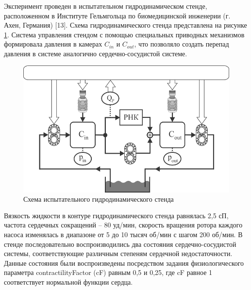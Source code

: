 Эксперимент проведен в испытательном гидродинамическом стенде, расположенном в Институте Гельмгольца по биомедицинской инженерии (г. Ахен, Германия) [13]. Схема гидродинамического стенда представлена на рисунке \ref{img:mcl}. Система управления стендом с помощью специальных приводных механизмов формировала давления в камерах $C_{in}$ и $C_{out}$, что позволяло создать перепад давления в системе аналогично сердечно-сосудистой системе.

\begin{figure}[!ht] 
  \center
  \includegraphics [scale=1.8] {../images/mcl_scheme_abs}
  \caption{Схема испытательного гидродинамического стенда} 
  \label{img:mcl}  
\end{figure}

Вязкость жидкости в контуре гидродинамического стенда равнялась 2,5 сП, частота сердечных сокращений -- 80 уд/мин, скорость вращения ротора каждого насоса изменялась в диапазоне от 5 до 10 тысяч об/мин с шагом 200 об/мин. В стенде последовательно воспроизводились два состояния сердечно-сосудистой системы, соответствующие различным степеням сердечной недостаточности. Данные состояния были воспроизведены посредством задания физиологического параметра contractilityFactor (cF) равным 0,5 и 0,25, где cF равное 1 соответствует нормальной функции сердца.


